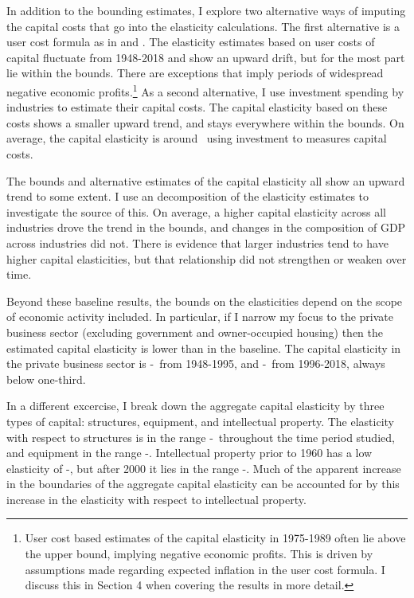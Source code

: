 \documentclass[11pt]{article}
\begin{document}
In addition to the bounding estimates, I explore two alternative ways of imputing the capital costs that go into the elasticity calculations. The first alternative is a user cost formula \citep{halljorg1967} as in \cite{Barkai000} and \cite{rognlie2015}. The elasticity estimates based on user costs of capital fluctuate from 1948-2018 and show an upward drift, but for the most part lie within the bounds. There are exceptions that imply periods of widespread negative economic profits.\footnote{User cost based estimates of the capital elasticity in 1975-1989 often lie above the upper bound, implying negative economic profits. This is driven by assumptions made regarding expected inflation in the user cost formula. I discuss this in Section 4 when covering the results in more detail.} As a second alternative, I use investment spending by industries to estimate their capital costs. The capital elasticity based on these costs shows a smaller upward trend, and stays everywhere within the bounds. On average, the capital elasticity is around \baseinv \ using investment to measures capital costs.

The bounds and alternative estimates of the capital elasticity all show an upward trend to some extent. I use an \cite{op1996} decomposition of the elasticity estimates to investigate the source of this. On average, a higher capital elasticity across all industries drove the trend in the bounds, and changes in the composition of GDP across industries did not. There is evidence that larger industries tend to have higher capital elasticities, but that relationship did not strengthen or weaken over time.

Beyond these baseline results, the bounds on the elasticities depend on the scope of economic activity included. In particular, if I narrow my focus to the private business sector (excluding government and owner-occupied housing) then the estimated capital elasticity is lower than in the baseline. The capital elasticity in the private business sector is \nohsearlydepr-\nohsearlynoprofit \ from 1948-1995, and \nohslatedepr-\nohslatenoprofit \ from 1996-2018, always below one-third. 

In a different excercise, I break down the aggregate capital elasticity by three types of capital: structures, equipment, and intellectual property. The elasticity with respect to structures is in the range \basestdepr-\basetnoprofit \ throughout the time period studied, and equipment in the range \baseeqdepr-\baseeqnoprofit. Intellectual property prior to 1960 has a low elasticity of \baseipearlydepr-\baseipearlynoprofit, but after 2000 it lies in the range \baseiplatedepr-\baseiplatenoprofit. Much of the apparent increase in the boundaries of the aggregate capital elasticity can be accounted for by this increase in the elasticity with respect to intellectual property.
\end{document}
